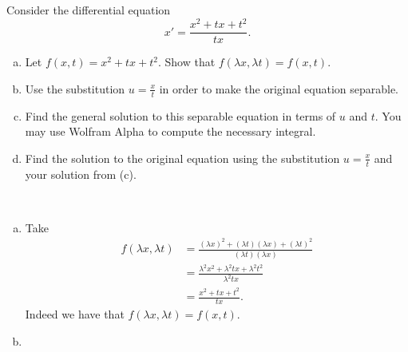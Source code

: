 \documentclass[12pt]{article} %
\begin{document}
\begin{problem}
    Consider the differential equation
    \[
    x'=\frac{x^2+tx+t^2}{tx}.
    \]
    \begin{enumerate}[(a)]
        \item Let $f(x,t)=x^2+tx+t^2$.  Show that $f(\lambda x, \lambda t)=f(x,t)$.
        \item Use the substitution $u=\frac{x}{t}$ in order to make the original equation separable.
        \item Find the general solution to this separable equation in terms of $u$ and $t$. You may use Wolfram Alpha to compute the necessary integral.
        \item Find the solution to the original equation using the substitution $u=\frac{x}{t}$ and your solution from (c).
    \end{enumerate}
\end{problem}
\begin{solution}~
\begin{enumerate}[(a)]
    \item Take
    \begin{align*}
        f(\lambda x, \lambda t) &= \frac{(\lambda x)^2 + (\lambda t)(\lambda x) + (\lambda t)^2}{(\lambda t) (\lambda x)}\\
        &= \frac{\lambda^2 x^2 + \lambda^2 tx + \lambda^2 t^2}{\lambda^2 tx}\\
        &= \frac{x^2+tx+t^2}{tx}.
    \end{align*}
    Indeed we have that $f(\lambda x, \lambda t)=f(x,t)$.
    \item 
\end{enumerate}
\end{solution}
\end{document}

